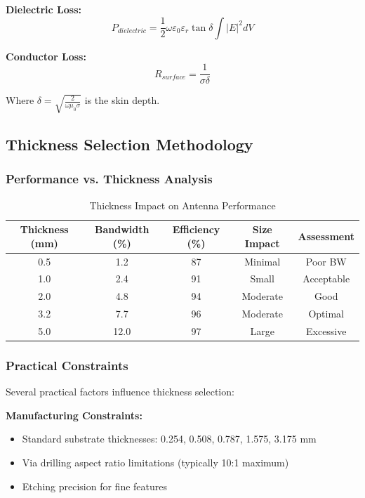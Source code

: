 \documentclass[12pt]{article}
\begin{document}
\textbf{Dielectric Loss:}
\[P_{dielectric} = \frac{1}{2}\omega\varepsilon_0\varepsilon_r \tan\delta \int |E|^2 dV\]

\textbf{Conductor Loss:}
\[R_{surface} = \frac{1}{\sigma\delta}\]

Where $\delta = \sqrt{\frac{2}{\omega\mu_0\sigma}}$ is the skin depth.

\subsection{Thickness Selection Methodology}

\subsubsection{Performance vs. Thickness Analysis}

\begin{table}[H]
\centering
\caption{Thickness Impact on Antenna Performance}
\begin{tabular}{|c|c|c|c|c|}
\hline
\textbf{Thickness (mm)} & \textbf{Bandwidth (\%)} & \textbf{Efficiency (\%)} & \textbf{Size Impact} & \textbf{Assessment} \\
\hline
0.5 & 1.2 & 87 & Minimal & Poor BW \\
\hline
1.0 & 2.4 & 91 & Small & Acceptable \\
\hline
2.0 & 4.8 & 94 & Moderate & Good \\
\hline
3.2 & 7.7 & 96 & Moderate & Optimal \\
\hline
5.0 & 12.0 & 97 & Large & Excessive \\
\hline
\end{tabular}
\end{table}

\subsubsection{Practical Constraints}

Several practical factors influence thickness selection:

\textbf{Manufacturing Constraints:}
\begin{itemize}
    \item Standard substrate thicknesses: 0.254, 0.508, 0.787, 1.575, 3.175 mm
    \item Via drilling aspect ratio limitations (typically 10:1 maximum)
    \item Etching precision for fine features
\end{itemize}
\end{document}
